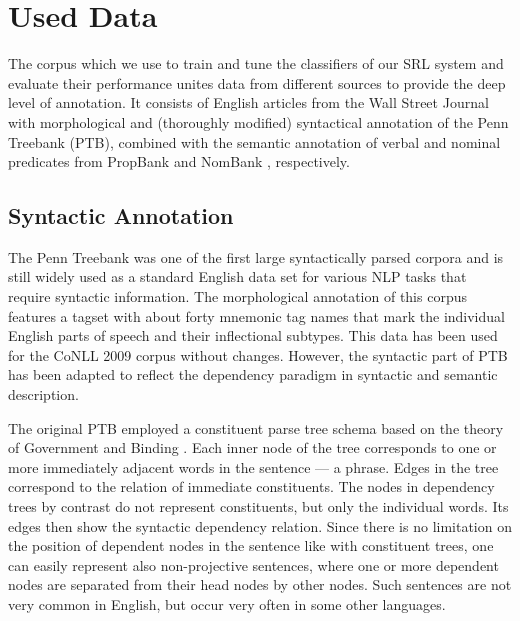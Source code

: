 \documentclass[12pt,notitlepage]{report}
\begin{document}
%
%
\chapter{Used Data}\label{data}
%
%

The corpus which we use to train and tune the classifiers of our SRL system and evaluate their performance \citep{surdeanu08,hajic09} unites data from different sources to provide the deep level of annotation. It consists of English articles from the Wall Street Journal with morphological and (thoroughly modified) syntactical annotation of the Penn Treebank (PTB), \citep{marcus93} combined with the semantic annotation of verbal and nominal predicates from PropBank \citep{palmer05} and NomBank \citep{meyers04}, respectively.

\section{Syntactic Annotation}

The Penn Treebank was one of the first large syntactically parsed corpora and is still widely used as a standard English data set for various NLP tasks that require syntactic information. The morphological annotation of this corpus features a tagset \citep{santorini90} with about forty mnemonic tag names that mark the individual English parts of speech and their inflectional subtypes. This data has been used for the CoNLL 2009 corpus without changes. However, the syntactic part of PTB has been adapted to reflect the dependency paradigm in syntactic and semantic description.

The original PTB employed a constituent parse tree schema based on the theory of Government and Binding \citep{chomsky81}. Each inner node of the tree corresponds to one or more immediately adjacent words in the sentence --- a phrase. Edges in the tree correspond to the relation of immediate constituents. The nodes in dependency trees by contrast do not represent constituents, but only the individual words. Its edges then show the syntactic dependency relation. Since there is no limitation on the position of dependent nodes in the sentence like with constituent trees, one can easily represent also non-projective sentences, where one or more dependent nodes are separated from their head nodes by other nodes. Such sentences are not very common in English, but occur very often in some other languages.
\end{document}
